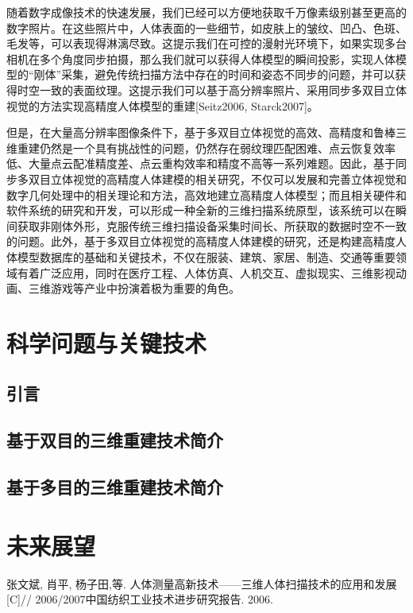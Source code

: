\documentclass[10pt]{article}
\begin{document}
随着数字成像技术的快速发展，我们已经可以方便地获取千万像素级别甚至更高的数字照片。在这些照片中，人体表面的一些细节，如皮肤上的皱纹、凹凸、色斑、毛发等，可以表现得淋漓尽致。这提示我们在可控的漫射光环境下，如果实现多台相机在多个角度同步拍摄，那么我们就可以获得人体模型的瞬间投影，实现人体模型的“刚体”采集，避免传统扫描方法中存在的时间和姿态不同步的问题，并可以获得时空一致的表面纹理。这提示我们可以基于高分辨率照片、采用同步多双目立体视觉的方法实现高精度人体模型的重建[Seitz2006, Starck2007]。
\par 但是，在大量高分辨率图像条件下，基于多双目立体视觉的高效、高精度和鲁棒三维重建仍然是一个具有挑战性的问题，仍然存在弱纹理匹配困难、点云恢复效率低、大量点云配准精度差、点云重构效率和精度不高等一系列难题。因此，基于同步多双目立体视觉的高精度人体建模的相关研究，不仅可以发展和完善立体视觉和数字几何处理中的相关理论和方法，高效地建立高精度人体模型；而且相关硬件和软件系统的研究和开发，可以形成一种全新的三维扫描系统原型，该系统可以在瞬间获取非刚体外形，克服传统三维扫描设备采集时间长、所获取的数据时空不一致的问题。此外，基于多双目立体视觉的高精度人体建模的研究，还是构建高精度人体模型数据库的基础和关键技术，不仅在服装、建筑、家居、制造、交通等重要领域有着广泛应用，同时在医疗工程、人体仿真、人机交互、虚拟现实、三维影视动画、三维游戏等产业中扮演着极为重要的角色。

\section{科学问题与关键技术}
\subsection{引言}

\subsection{基于双目的三维重建技术简介}

\subsection{基于多目的三维重建技术简介}

\section{未来展望}


\begin{thebibliography}{1}
	张文斌, 肖平, 杨子田,等. 人体测量高新技术——三维人体扫描技术的应用和发展[C]// 2006/2007中国纺织工业技术进步研究报告. 2006.
\end{thebibliography}
\end{document}
